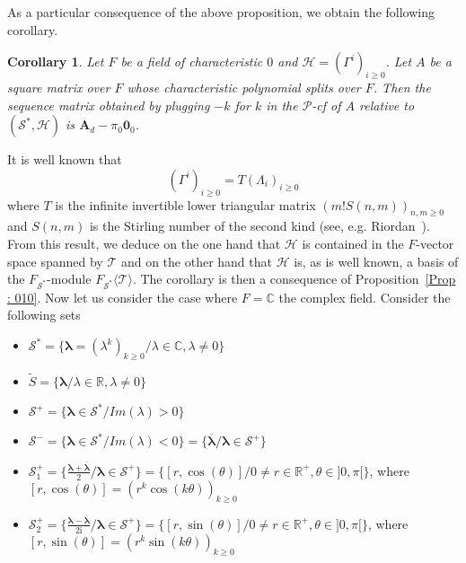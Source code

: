\documentclass[12pt]{amsart}
\newtheorem{cor}[thrm]{Corollary}
\theoremstyle{definition}
\numberwithin{equation}{section}
\numberwithin{equation}{section}
\begin{document}
As a particular consequence of the above proposition, we obtain the following corollary.
\begin{cor} Let $F$ be a field of characteristic $0$ and $\mathcal{H}=(\Gamma^{i})_{i\geqslant 0}$. Let $A$ be a square matrix over $F$ whose characteristic polynomial splits over $F$. Then the sequence matrix obtained by plugging $-k$ for $k$ in the $\mathcal{P}$-cf of $A$ relative to $(\mathcal{S}^{\ast}, \mathcal{H})$ is $\pmb{A}_{d}-\pi_{0}\pmb{0}_{0}$.
\end{cor}
 \proof It is well known that
 \begin{equation*}
(\Gamma^{i})_{i\geqslant 0}=T(\Lambda_{i})_{i\geqslant 0}
\end{equation*}
where $T$ is the infinite invertible lower triangular matrix $(m!S(n,m))_{n,m\geqslant 0}$ and $S(n,m)$ is the Stirling number of the second kind (see, e.g. Riordan~\cite{Riord}).
\\From this result, we deduce on the one hand that $\mathcal{H}$ is contained in the $F$-vector space spanned by $\mathcal{T}$ and on the other hand that $\mathcal{H}$ is, as is well known, a basis of the $F_{\mathcal{S}^{\ast}}$-module $F_{\mathcal{S}^{\ast}}\langle \mathcal{T} \rangle$. The corollary is then a consequence of Proposition~\ref{Prop : 010}.
\endproof
Now let us consider the case where $F=\mathbb{C}$ the complex field. Consider the following sets
\begin{itemize}
\item $\mathcal{S}^{\ast}=\{\pmb{\lambda}=(\lambda^{k})_{k\geqslant 0}/\lambda\in \mathbb{C}, \lambda\neq 0\}$
\item $\widetilde{S}=\{\pmb{\lambda}/\lambda\in \mathbb{R}, \lambda\neq 0\}$
\item $\mathcal{S}^{+}=\{\pmb{\lambda}\in \mathcal{S}^{\ast}/ Im(\lambda)> 0\}$
\item $\mathcal{S}^{-}=\{\pmb{\lambda}\in \mathcal{S}^{\ast}/ Im(\lambda)< 0\}=\{\pmb{\overline{\lambda}}/ \pmb{\lambda}\in \mathcal{S}^{+}\}$
\item $\mathcal{S}^{+}_{1}=\{\frac{\pmb{\lambda}+\pmb{\overline{\lambda}}}{2}/\pmb{\lambda}\in \mathcal{S}^{+}\}=\{[r,\cos(\theta)]/0\neq r\in \mathbb{R}^{+}, \theta\in ]0,\pi[\}$, where $[r,\cos(\theta)]=(r^{k}\cos(k\theta))_{k\geq 0}$
\item $\mathcal{S}^{+}_{2}=\{\frac{\pmb{\lambda}-\pmb{\overline{\lambda}}}{2\mathrm{i}}/\pmb{\lambda}\in \mathcal{S}^{+}\}=\{[r,\sin(\theta)]/0\neq r\in \mathbb{R}^{+}, \theta\in ]0,\pi[\}$, where $[r,\sin(\theta)]=(r^{k}\sin(k\theta))_{k\geq 0}$
    \end{itemize}
\end{document}
